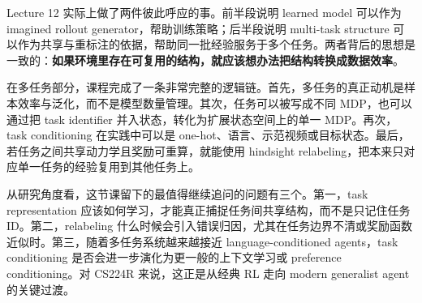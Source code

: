 \documentclass[a4paper]{article}
\begin{document}
Lecture 12 实际上做了两件彼此呼应的事。前半段说明 learned model 可以作为 imagined rollout generator，帮助训练策略；后半段说明 multi-task structure 可以作为共享与重标注的依据，帮助同一批经验服务于多个任务。两者背后的思想是一致的：\textbf{如果环境里存在可复用的结构，就应该想办法把结构转换成数据效率}。

在多任务部分，课程完成了一条非常完整的逻辑链。首先，多任务的真正动机是样本效率与泛化，而不是模型数量管理。其次，任务可以被写成不同 MDP，也可以通过把 task identifier 并入状态，转化为扩展状态空间上的单一 MDP。再次，task conditioning 在实践中可以是 one-hot、语言、示范视频或目标状态。最后，若任务之间共享动力学且奖励可重算，就能使用 hindsight relabeling，把本来只对应单一任务的经验复用到其他任务上。

从研究角度看，这节课留下的最值得继续追问的问题有三个。第一，task representation 应该如何学习，才能真正捕捉任务间共享结构，而不是只记住任务 ID。第二，relabeling 什么时候会引入错误归因，尤其在任务边界不清或奖励函数近似时。第三，随着多任务系统越来越接近 language-conditioned agents，task conditioning 是否会进一步演化为更一般的上下文学习或 preference conditioning。对 CS224R 来说，这正是从经典 RL 走向 modern generalist agent 的关键过渡。
\end{document}
